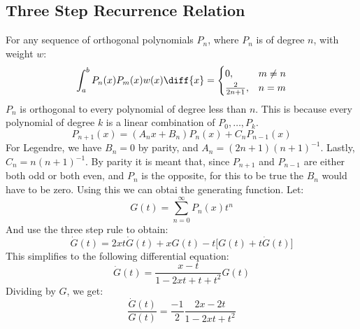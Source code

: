         \subsection{Three Step Recurrence Relation}
            For any sequence of orthogonal polynomials $P_{n}$,
            where $P_{n}$ is of degree $n$, with weight $w$:
            \begin{equation}
                \int_{a}^{b}P_{n}(x)P_{m}(x)w(x)\diff{x}=
                \begin{cases}
                    0,&m\ne{n}\\
                    \frac{2}{2n+1},&n=m
                \end{cases}
            \end{equation}
            $P_{n}$ is orthogonal to every polynomial of
            degree less than $n$. This is because every
            polynomial of degree $k$ is a linear combination
            of $P_{0},\dots,P_{k}$.
            \begin{equation}
                P_{n+1}(x)=(A_{n}x+B_{n})P_{n}(x)+
                    C_{n}P_{n-1}(x)
            \end{equation}
            For Legendre, we have $B_{n}=0$ by parity, and
            $A_{n}=(2n+1)(n+1)^{\minus{1}}$. Lastly,
            $C_{n}=n(n+1)^{\minus{1}}$. By parity it is meant
            that, since $P_{n+1}$ and $P_{n-1}$ are either both
            odd or both even, and $P_{n}$ is the opposite, for
            this to be true the $B_{n}$ would have to be zero.
            Using this we can obtai the generating function. Let:
            \begin{equation}
                G(t)=\sum_{n=0}^{\infty}P_{n}(x)t^{n}
            \end{equation}
            And use the three step rule to obtain:
            \begin{equation}
                \dot{G}(t)=2xt\dot{G}(t)+xG(t)-t\big[
                    G(t)+t\dot{G}(t)\big]
            \end{equation}
            This simplifies to the following differential
            equation:
            \begin{equation}
                \dot{G}(t)=\frac{x-t}{1-2xt+t+t^{2}}G(t)
            \end{equation}
            Dividing by $G$, we get:
            \begin{equation}
                \frac{\dot{G}(t)}{G(t)}=
                \frac{\minus{1}}{2}\frac{2x-2t}{1-2xt+t^{2}}
            \end{equation}

